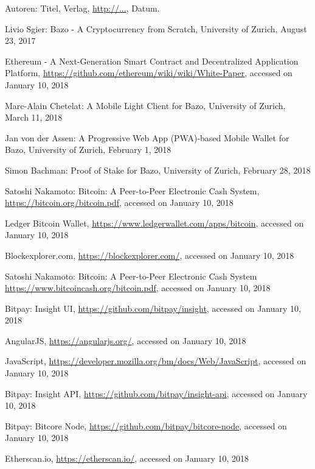 \begin{thebibliography}{99}

 Autoren: Titel, Verlag, \url{http://...}, Datum.

 Livio Sgier: Bazo - A Cryptocurrency from Scratch, University of Zurich, August 23, 2017

 Ethereum - A Next-Generation Smart Contract and Decentralized Application Platform, \url{https://github.com/ethereum/wiki/wiki/White-Paper}, accessed on January 10, 2018

 Marc-Alain Chetelat: A Mobile Light Client for Bazo, University of Zurich, March 11, 2018

 Jan von der Assen: A Progressive Web App (PWA)-based Mobile Wallet for Bazo, University of Zurich, February 1, 2018

 Simon Bachman: Proof of Stake for Bazo, University of Zurich, February 28, 2018

 Satoshi Nakamoto: Bitcoin: A Peer-to-Peer Electronic Cash System, \url{https://bitcoin.org/bitcoin.pdf}, accessed on January 10, 2018

 Ledger Bitcoin Wallet, \url{https://www.ledgerwallet.com/apps/bitcoin}, accessed on January 10, 2018

 Blockexplorer.com, \url{https://blockexplorer.com/}, accessed on January 10, 2018

 Satoshi Nakamoto: Bitcoin: A Peer-to-Peer Electronic Cash System \url{https://www.bitcoincash.org/bitcoin.pdf}, accessed on January 10, 2018

 Bitpay: Insight UI, \url{https://github.com/bitpay/insight}, accessed on January 10, 2018

 AngularJS, \url{https://angularjs.org/}, accessed on January 10, 2018

 JavaScript, \url{https://developer.mozilla.org/bm/docs/Web/JavaScript}, accessed on January 10, 2018

 Bitpay: Insight API, \url{https://github.com/bitpay/insight-api}, accessed on January 10, 2018

 Bitpay: Bitcore Node, \url{https://github.com/bitpay/bitcore-node}, accessed on January 10, 2018

 Etherscan.io, \url{https://etherscan.io/}, accessed on January 10, 2018


\end{thebibliography}
